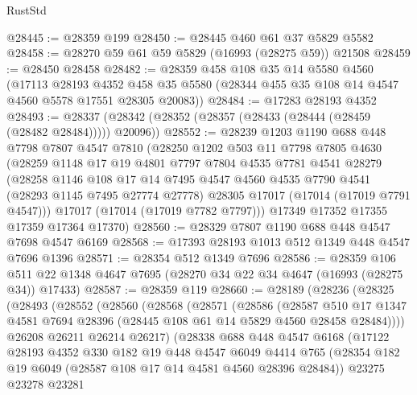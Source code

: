 \begin{lexlean}{RustStd}
\begin{coremodule}
{\begin{coremodule}
{{{{{{{{{{{{{{{{{{{{{{{{{{{{{{{{{{{{{{{{{{{{{{{{{{{{{{{@28445 := @28359 @199
@28450 := @28445 @460 @61 @37 @5829 @5582
@28458 := @28270 @59 @61 @59 @5829 (@16993 (@28275 @59)) @21508
@28459 := @28450 @28458
@28482 := @28359
    @458
    @108
    @35
    @14
    @5580
    @4560
    (@17113
      @28193
      @4352
      @458
      @35
      @5580
      (@28344 @455 @35 @108 @14 @4547 @4560 @5578 @17551 @28305 @20083))
@28484 := @17283 @28193 @4352
@28493 := @28337 (@28342 (@28352 (@28357 (@28433 (@28444 (@28459 (@28482 @28484))))) @20096))
@28552 := @28239
    @1203
    @1190
    @688
    @448
    @7798
    @7807
    @4547
    @7810
    (@28250
      @1202
      @503
      @11
      @7798
      @7805
      @4630
      (@28259
        @1148
        @17
        @19
        @4801
        @7797
        @7804
        @4535
        @7781
        @4541
        @28279
        (@28258
          @1146
          @108
          @17
          @14
          @7495
          @4547
          @4560
          @4535
          @7790
          @4541
          (@28293 @1145 @7495 @27774 @27778)
          @28305
          @17017
          (@17014 (@17019 @7791 @4547)))
        @17017
        (@17014 (@17019 @7782 @7797)))
      @17349
      @17352
      @17355
      @17359
      @17364
      @17370)
@28560 := @28329 @7807 @1190 @688 @448 @4547 @7698 @4547 @6169
@28568 := @17393 @28193 @1013 @512 @1349 @448 @4547 @7696 @1396
@28571 := @28354 @512 @1349 @7696
@28586 := @28359
    @106
    @511
    @22
    @1348
    @4647
    @7695
    (@28270 @34 @22 @34 @4647 (@16993 (@28275 @34)) @17433)
@28587 := @28359 @119
@28660 := @28189
    (@28236
      (@28325
        (@28493
          (@28552
            (@28560
              (@28568
                (@28571
                  (@28586
                    (@28587
                      @510
                      @17
                      @1347
                      @4581
                      @7694
                      @28396
                      (@28445 @108 @61 @14 @5829 @4560 @28458 @28484))))
                @26208
                @26211
                @26214
                @26217)
              (@28338
                @688
                @448
                @4547
                @6168
                (@17122
                  @28193
                  @4352
                  @330
                  @182
                  @19
                  @448
                  @4547
                  @6049
                  @4414
                  @765
                  (@28354 @182 @19 @6049 (@28587 @108 @17 @14 @4581 @4560 @28396 @28484))
                  @23275
                  @23278
                  @23281
}}}}}}}}}}}}}}}}}}}}}}}}}}}}}}}}}}}}}}}}}}}}}}}}}}}}}}}
\end{coremodule}}
\end{coremodule}
\end{lexlean}
